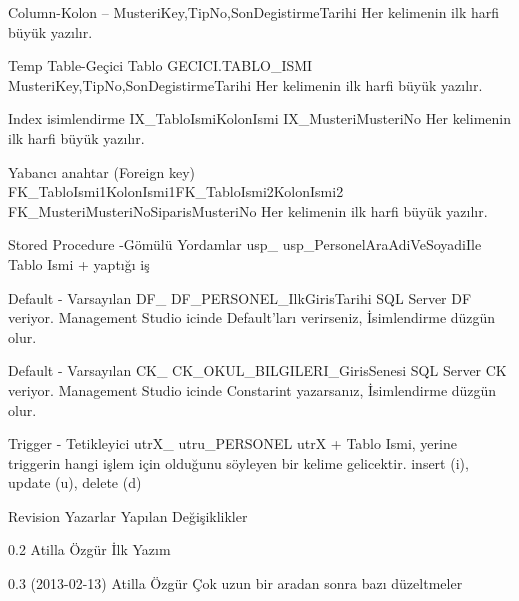\documentclass[10pt,a4paper,draft]{article}
\begin{document}
     Column-Kolon 
     -- 
    MusteriKey,TipNo,SonDegistirmeTarihi 
    Her kelimenin ilk harfi büyük yazılır. 
  
     Temp Table-Geçici Tablo 
     GECICI.TABLO\_ISMI 
    MusteriKey,TipNo,SonDegistirmeTarihi 
    Her kelimenin ilk harfi büyük yazılır. 
  
     Index isimlendirme 
     IX\_TabloIsmiKolonIsmi 
     IX\_MusteriMusteriNo 
    Her kelimenin ilk harfi büyük yazılır. 
  
     Yabancı anahtar (Foreign key) 
     FK\_TabloIsmi1KolonIsmi1FK\_TabloIsmi2KolonIsmi2 
     FK\_MusteriMusteriNoSiparisMusteriNo 
    Her kelimenin ilk harfi büyük yazılır. 
  
     Stored Procedure -Gömülü Yordamlar 
     usp\_ 
     usp\_PersonelAraAdiVeSoyadiIle 
     Tablo Ismi + yaptığı iş 		  
  
    Default - Varsayılan 
     DF\_ 
     DF\_PERSONEL\_IlkGirisTarihi 
     SQL Server DF veriyor. Management Studio icinde Default'ları 
      verirseniz, İsimlendirme düzgün olur. 		  
  
     Default - Varsayılan 
     CK\_ 
     CK\_OKUL\_BILGILERI\_GirisSenesi 
     SQL Server CK veriyor. Management Studio icinde Constarint 
      yazarsanız, İsimlendirme düzgün olur. 				 
  
     Trigger - Tetikleyici 
     utrX\_ 
     utru\_PERSONEL 
      utrX + Tablo Ismi, yerine triggerin hangi işlem için olduğunu 
      söyleyen bir kelime gelicektir. insert (i), update (u), delete (d)
  

  
      
      
Revision 
Yazarlar 
Yapılan Değişiklikler 
  
     0.2  
     Atilla Özgür 
    İlk Yazım 
    
  
     0.3 (2013-02-13) 
     Atilla Özgür 
    Çok uzun bir aradan sonra bazı düzeltmeler 
    
    
\end{document}
